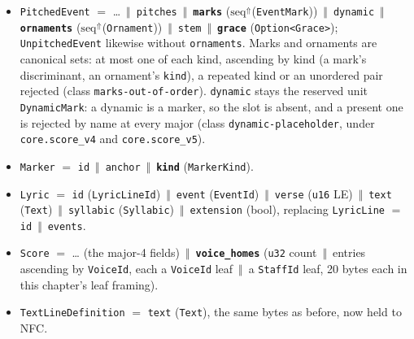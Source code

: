 \documentclass[11pt,letterpaper]{report}
\newcommand{\cat}{\ensuremath{\,\Vert\,}}
\begin{document}
\begin{itemize}
  \item \texttt{PitchedEvent} $=$ \ldots{} \cat{} \texttt{pitches} \cat{}
    \textbf{\texttt{marks}} ($\mathrm{seq}^{\Uparrow}$(\texttt{EventMark}))
    \cat{} \texttt{dynamic} \cat{} \textbf{\texttt{ornaments}}
    ($\mathrm{seq}^{\Uparrow}$(\texttt{Ornament})) \cat{} \texttt{stem}
    \cat{} \textbf{\texttt{grace}} (\texttt{Option<Grace>});
    \texttt{UnpitchedEvent} likewise without \texttt{ornaments}. Marks and
    ornaments are canonical sets: at most one of each kind, ascending by
    kind (a mark's discriminant, an ornament's \texttt{kind}), a repeated
    kind or an unordered pair rejected (class \texttt{marks-out-of-order}). \texttt{dynamic} stays the reserved unit
    \texttt{DynamicMark}: a dynamic is a marker, so the slot is absent, and a
    present one is rejected by name at every major (class
    \texttt{dynamic-placeholder}, under \texttt{core.score\_v4} and
    \texttt{core.score\_v5}).
  \item \texttt{Marker} $=$ \texttt{id} \cat{} \texttt{anchor} \cat{}
    \textbf{\texttt{kind}} (\texttt{MarkerKind}).
  \item \texttt{Lyric} $=$ \texttt{id} (\texttt{LyricLineId}) \cat{}
    \texttt{event} (\texttt{EventId}) \cat{} \texttt{verse} (\texttt{u16}
    LE) \cat{} \texttt{text} (\texttt{Text}) \cat{} \texttt{syllabic}
    (\texttt{Syllabic}) \cat{} \texttt{extension} (bool), replacing
    \texttt{LyricLine} $=$ \texttt{id} \cat{} \texttt{events}.
  \item \texttt{Score} $=$ \ldots{} (the major-4 fields) \cat{}
    \textbf{\texttt{voice\_homes}} (\texttt{u32} count \cat{} entries
    ascending by \texttt{VoiceId}, each a \texttt{VoiceId} leaf \cat{} a
    \texttt{StaffId} leaf, 20 bytes each in this chapter's leaf framing).
  \item \texttt{TextLineDefinition} $=$ \texttt{text} (\texttt{Text}),
    the same bytes as before, now held to NFC.
\end{itemize}
\end{document}
